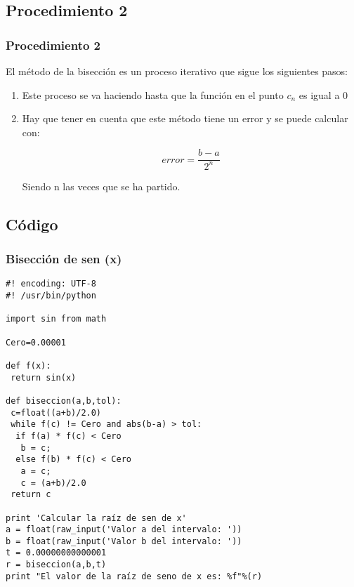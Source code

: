 \documentclass{beamer}
\begin{document}
\subsection{Procedimiento 2}
\begin{frame}
\frametitle{Procedimiento 2}
El método de la bisección es un proceso iterativo que sigue los siguientes pasos:
\begin{enumerate}
 \item
  Este proceso se va haciendo hasta que la función en el punto $c_n$ es igual a $0$
 \pause
 \item
  Hay que tener en cuenta que este método tiene un error y se puede calcular con:
  \begin{center}
   $$ error=\frac{b-a}{2^n} $$ 
  \end{center} 
  Siendo n las veces que se ha partido.
 \pause
 
\end{enumerate}
\end{frame}

\subsection{Código} 
\begin{frame}[fragile]

\frametitle{Bisección de sen (x)}
\small
\begin{verbatim}
#! encoding: UTF-8 
#! /usr/bin/python 

import sin from math

Cero=0.00001

def f(x):
 return sin(x)

def biseccion(a,b,tol):
 c=float((a+b)/2.0)
 while f(c) != Cero and abs(b-a) > tol:
  if f(a) * f(c) < Cero
   b = c;
  else f(b) * f(c) < Cero
   a = c;
   c = (a+b)/2.0
 return c

print 'Calcular la raíz de sen de x'
a = float(raw_input('Valor a del intervalo: '))
b = float(raw_input('Valor b del intervalo: '))
t = 0.00000000000001
r = biseccion(a,b,t)
print "El valor de la raíz de seno de x es: %f"%(r)
\end{verbatim}

\end{frame}
\end{document}
